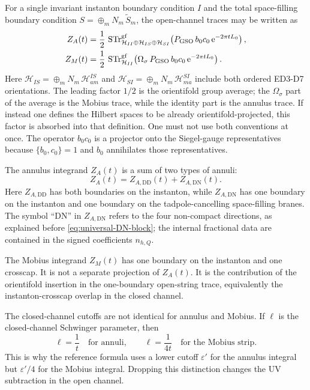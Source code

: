 \documentclass[11pt]{article}
\newcommand{\cH}{\mathcal{H}}
\newcommand{\wt}{\widetilde}
\newcommand{\DN}{\mathrm{DN}}
\newcommand{\DD}{\mathrm{DD}}
\newcommand{\orient}{\Omega_\sigma}
\newcommand{\e}{\mathrm{e}}
\newcommand{\eps}{\varepsilon}
\begin{document}
For a single invariant instanton boundary condition $I$ and the total space-filling boundary
condition $S=\oplus_m N_m\,\wt S_m$, the open-channel traces may be written as
\begin{align}
  Z_A(t)
  &=
  \frac{1}{2}\,
  \operatorname{STr}^{\rm gf}_{\cH_{II}\oplus\cH_{IS}\oplus\cH_{SI}}
  \!\left(
    P_{\rm GSO}\,b_0c_0\,\e^{-2\pi t L_0}
  \right),
  \label{eq:trace-ZA}
  \\
  Z_M(t)
  &=
  \frac{1}{2}\,
  \operatorname{STr}^{\rm gf}_{\cH_{II}}
  \!\left(
    \orient\,P_{\rm GSO}\,b_0c_0\,\e^{-2\pi t L_0}
  \right).
  \label{eq:trace-ZM}
\end{align}
Here $\cH_{IS}=\oplus_m N_m\,\cH^{IS}_{a m}$ and
$\cH_{SI}=\oplus_m N_m\,\cH^{SI}_{m a}$ include both ordered ED3-D7 orientations. The leading
factor $1/2$ is the orientifold group average; the $\orient$ part of the average is the Mobius
trace, while the identity part is the annulus trace. If instead one defines the Hilbert spaces
to be already orientifold-projected, this factor is absorbed into that definition. One must not
use both conventions at once. The operator $b_0c_0$ is a projector onto the Siegel-gauge
representatives because $\{b_0,c_0\}=1$ and $b_0$ annihilates those representatives.

The annulus integrand $Z_A(t)$ is a sum of two types of annuli:
\begin{equation}
  Z_A(t)=Z_{A,\DD}(t)+Z_{A,\DN}(t).
  \label{eq:ZA-definition}
\end{equation}
Here $Z_{A,\DD}$ has both boundaries on the instanton, while $Z_{A,\DN}$ has one boundary on
the instanton and one boundary on the tadpole-cancelling space-filling branes. The symbol
``DN'' in $Z_{A,\DN}$ refers to the four non-compact directions, as explained before
\eqref{eq:universal-DN-block}; the internal fractional data are contained in the signed
coefficients $n_{h,Q}$.

The Mobius integrand $Z_M(t)$ has one boundary on the instanton and one crosscap. It is not a
separate projection of $Z_A(t)$. It is the contribution of the orientifold insertion in the
one-boundary open-string trace, equivalently the instanton-crosscap overlap in the closed
channel.

The closed-channel cutoffs are not identical for annulus and Mobius. If $\ell$ is the
closed-channel Schwinger parameter, then
\begin{equation}
  \ell=\frac{1}{t}
  \quad \text{for annuli},
  \qquad
  \ell=\frac{1}{4t}
  \quad \text{for the Mobius strip}.
  \label{eq:cutoff-relation}
\end{equation}
This is why the reference formula uses a lower cutoff $\eps'$ for the annulus integral but
$\eps'/4$ for the Mobius integral. Dropping this distinction changes the UV subtraction in the
open channel.
\end{document}
